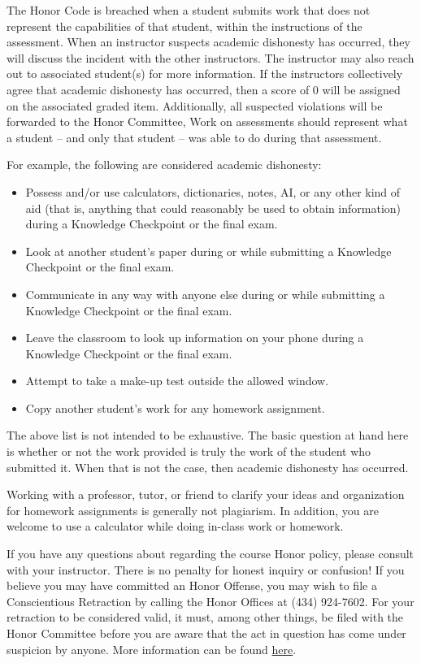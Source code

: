 \documentclass[12pt]{article}
\begin{document}
    The Honor Code is breached when a student submits work that does not represent the capabilities of that student, within the instructions of the assessment. When an instructor suspects academic dishonesty has occurred, they will discuss the incident with the other instructors. The instructor may also reach out to associated student(s) for more information. If the instructors collectively agree that academic dishonesty has occurred, then a score of 0 will be assigned on the associated graded item. Additionally, all suspected violations will be forwarded to the Honor Committee, Work on assessments should represent what a student – and only that student – was able to do during that assessment. 
    
    For example, the following are considered academic dishonesty:
    \begin{itemize}
        \item Possess and/or use calculators, dictionaries, notes, AI, or any other kind of aid (that is, anything that could reasonably be used to obtain information) during a Knowledge Checkpoint or the final exam.
        \item Look at another student’s paper during or while submitting a Knowledge Checkpoint or the final exam.
        \item Communicate in any way with anyone else during or while submitting a Knowledge Checkpoint or the final exam.
        \item Leave the classroom to look up information on your phone during a Knowledge Checkpoint or the final exam.
        \item Attempt to take a make-up test outside the allowed window.
        \item Copy another student's work for any homework assignment.
    \end{itemize}

    The above list is not intended to be exhaustive. The basic question at hand here is whether or not the work provided is truly the work of the student who submitted it. When that is not the case, then academic dishonesty has occurred.
    
    Working with a professor, tutor, or friend to clarify your ideas and organization for homework assignments is generally not plagiarism. In addition, you are welcome to use a calculator while doing in-class work or homework. 
    
    If you have any questions about regarding the course Honor policy, please consult with your instructor. There is no penalty for honest inquiry or confusion! If you believe you may have committed an Honor Offense, you may wish to file a Conscientious Retraction by calling the Honor Offices at (434) 924-7602. For your retraction to be considered valid, it must, among other things, be filed with the Honor Committee before you are aware that the act in question has come under suspicion by anyone. More information can be found \href{http://www.virginia.edu/honor}{here}. 
	
\end{document}
